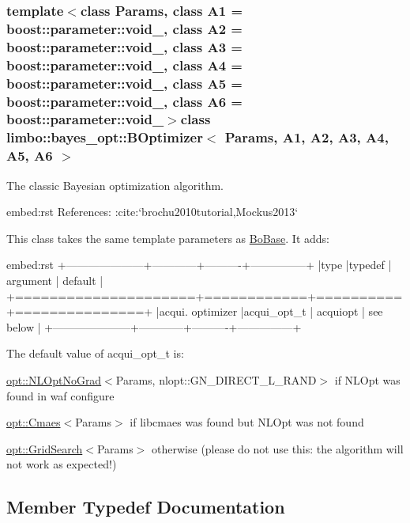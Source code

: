 \subsubsection*{template$<$class Params, class A1 = boost\+::parameter\+::void\+\_\+, class A2 = boost\+::parameter\+::void\+\_\+, class A3 = boost\+::parameter\+::void\+\_\+, class A4 = boost\+::parameter\+::void\+\_\+, class A5 = boost\+::parameter\+::void\+\_\+, class A6 = boost\+::parameter\+::void\+\_\+$>$class limbo\+::bayes\+\_\+opt\+::\+B\+Optimizer$<$ Params, A1, A2, A3, A4, A5, A6 $>$}

The classic Bayesian optimization algorithm.

\begin{DoxyVerb}embed:rst
References: :cite:`brochu2010tutorial,Mockus2013`
\end{DoxyVerb}


This class takes the same template parameters as \hyperlink{classlimbo_1_1bayes__opt_1_1_bo_base}{Bo\+Base}. It adds\+: \begin{DoxyVerb}embed:rst
+---------------------+------------+----------+---------------+
|type                 |typedef     | argument | default       |
+=====================+============+==========+===============+
|acqui. optimizer     |acqui_opt_t | acquiopt | see below     |
+---------------------+------------+----------+---------------+
\end{DoxyVerb}


The default value of acqui\+\_\+opt\+\_\+t is\+:
\begin{DoxyItemize}
\item {\ttfamily \hyperlink{structlimbo_1_1opt_1_1_n_l_opt_no_grad}{opt\+::\+N\+L\+Opt\+No\+Grad}$<$Params, nlopt\+::\+G\+N\+\_\+\+D\+I\+R\+E\+C\+T\+\_\+\+L\+\_\+\+R\+A\+N\+D$>$} if N\+L\+Opt was found in {\ttfamily waf configure}
\item {\ttfamily \hyperlink{structlimbo_1_1opt_1_1_cmaes}{opt\+::\+Cmaes}$<$Params$>$} if libcmaes was found but N\+L\+Opt was not found
\item {\ttfamily \hyperlink{structlimbo_1_1opt_1_1_grid_search}{opt\+::\+Grid\+Search}$<$Params$>$} otherwise (please do not use this\+: the algorithm will not work as expected!) 
\end{DoxyItemize}

\subsection{Member Typedef Documentation}
\hypertarget{classlimbo_1_1bayes__opt_1_1_b_optimizer_a18dc1b593c859b8f89450a31f80fb592}{}
